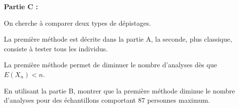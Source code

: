 \documentclass[10pt]{article}
\begin{document}
\bigskip

\textbf{Partie C :}

\medskip

On cherche à comparer deux types de dépistages. 

La première méthode est décrite dans la partie A, la seconde, plus classique, consiste à tester tous les individus. 

La première méthode permet de diminuer le nombre d'analyses dès que $E\left(X_n\right)  < n$.

En utilisant la partie B, montrer que la première méthode diminue le nombre d'analyses pour des échantillons comportant $87$ personnes maximum.

\bigskip
\end{document}
